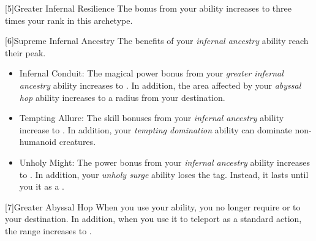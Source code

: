             [5]{Greater Infernal Resilience}  The bonus from your  ability increases to three times your rank in this archetype.

            [6]{Supreme Infernal Ancestry} The benefits of your \textit{infernal ancestry} ability reach their peak.
            \begin{itemize}
                \item Infernal Conduit: The magical power bonus from your \textit{greater infernal ancestry} ability increases to .
                    In addition, the area affected by your \textit{abyssal hop} ability increases to a \medarea radius from your destination.
                \item Tempting Allure: The skill bonuses from your \textit{infernal ancestry} ability increase to .
                    In addition, your \textit{tempting domination} ability can dominate non-humanoid creatures.
                \item Unholy Might: The power bonus from your \textit{infernal ancestry} ability increases to .
                    In addition, your \textit{unholy surge} ability loses the  tag.
                    Instead, it lasts until you  it as a .
            \end{itemize}

            [7]{Greater Abyssal Hop} When you use your  ability, you no longer require  or  to your destination.
            In addition, when you use it to teleport as a standard action, the range increases to \distrange.




